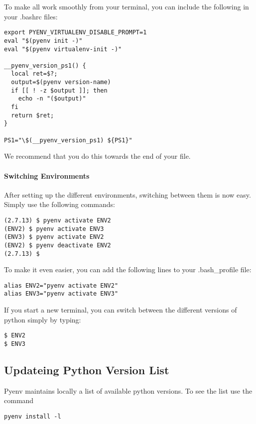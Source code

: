 To make all work smoothly from your terminal, you can include the
following in your .bashrc files:

\begin{verbatim}
export PYENV_VIRTUALENV_DISABLE_PROMPT=1
eval "$(pyenv init -)"
eval "$(pyenv virtualenv-init -)"

__pyenv_version_ps1() {
  local ret=$?;
  output=$(pyenv version-name)
  if [[ ! -z $output ]]; then
    echo -n "($output)"
  fi
  return $ret;
}

PS1="\$(__pyenv_version_ps1) ${PS1}"
\end{verbatim}

We recommend that you do this towards the end of your file.

\paragraph{Switching Environments}\label{switching-environments}

After setting up the different environments, switching between them is
now easy. Simply use the following commands:

\begin{verbatim}
(2.7.13) $ pyenv activate ENV2
(ENV2) $ pyenv activate ENV3
(ENV3) $ pyenv activate ENV2
(ENV2) $ pyenv deactivate ENV2
(2.7.13) $ 
\end{verbatim}

To make it even easier, you can add the following lines to your
.bash\_profile file:

\begin{verbatim}
alias ENV2="pyenv activate ENV2"
alias ENV3="pyenv activate ENV3"
\end{verbatim}

If you start a new terminal, you can switch between the different
versions of python simply by typing:

\begin{verbatim}
$ ENV2
$ ENV3
\end{verbatim}

\subsection{Updateing Python Version List}

Pyenv maintains locally a list of available python versions. To see
the list use the command

\begin{lstlisting}
pyenv install -l
\end{lstlisting}

